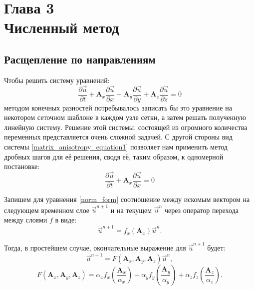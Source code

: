 \section*{Глава 3\\Численный метод}
\setcounter{section}{3}
\setcounter{subsection}{0}
\setcounter{equation}{0}

\subsection{Расщепление по направлениям}

	Чтобы решить систему уравнений:
\begin{equation}
	\label{matrix_anisotropy_equation1}
	\frac{\partial\vec{u}}{\partial{t}}+\mathbf{A}_x\frac{\partial\vec{u}}{\partial{x}}+
	\mathbf{A}_y\frac{\partial\vec{u}}{\partial{y}}+
	\mathbf{A}_z\frac{\partial\vec{u}}{\partial{z}}=0
\end{equation}
	методом конечных разностей потребывалось записать бы это уравнение на некотором сеточном шаблоне в каждом узле сетки, а затем решать полученную линейную систему.
	Решение этой системы, состоящей из огромного количества переменных представляется очень сложной задачей.
	С другой стороны вид системы \eqref{matrix_anisotropy_equation1} позволяет нам применить метод дробных шагов для её решения, сводя её, таким образом, к одномерной постановке:
\begin{equation}
	\label{norm_form}
	\frac{\partial\vec{u}}{\partial{t}}+\mathbf{A}_x\frac{\partial\vec{u}}{\partial{x}} = 0
\end{equation}

	Запишем для уравнения \eqref{norm_form} соотношение между искомым вектором на следующем временном слое $\vec{u}^{n+1}$ и на текущем $\vec{u}^{n}$ через оператор перехода между слоями $f$ в виде:
\begin{equation}
	\label{simple_splitting}
	\vec{u}^{n+1} = f_x(\mathbf{A}_x)\vec{u}^{n}.
\end{equation}	
	
	Тогда, в простейшем случае, окончательные выражение для $\vec{u}^{n+1}$ будет:
\begin{equation}
	\label{simple_3D_splitting}
	\vec{u}^{n+1} = F(\mathbf{A}_x, \mathbf{A}_y, \mathbf{A}_z)\vec{u}^{n},
\end{equation}
\begin{equation}
	\label{simple_3D_split_operator}
	F(\mathbf{A}_x, \mathbf{A}_y, \mathbf{A}_z) = \alpha_x f_x(\frac{\mathbf{A}_x}{\alpha_x}) + \alpha_y f_y(\frac{\mathbf{A}_y}{\alpha_y}) + \alpha_z f_z(\frac{\mathbf{A}_z}{\alpha_z}).
\end{equation}
	
